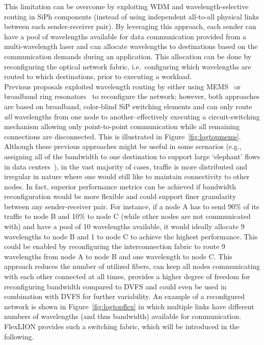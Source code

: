 This limitation can be overcome by exploiting WDM and wavelength-selective routing in SiPh components (instead of using independent all-to-all physical links between each sender-receiver pair). By leveraging this approach, each sender can have a pool of wavelengths available for data communication provided from a multi-wavelength laser and can allocate wavelengths to destinations based on the communication demands during an application. This allocation can be done by reconfiguring the optical network fabric, i.e.\ configuring which wavelengths are routed to which destinations, prior to executing a workload.\\
Previous proposals exploited wavelength routing by either using MEMS~\cite{seok2016highly} or broadband ring resonators~\cite{bergman2014photonic} to reconfigure the network; however, both approaches are based on broadband, color-blind SiP switching elements and can only route \textit{all} wavelengths from one node to another--effectively executing a circuit-switching mechanism allowing only point-to-point communication while all remaining connections are disconnected. This is illustrated in Figure~\ref{fig:logtopmems}. \\
Although these previous approaches might be useful in some scenarios (e.g., assigning all of the bandwidth to one destination to support large `elephant' flows in data centers~\cite{Farrington2010Helios}), in the vast majority of cases, traffic is more distributed and irregular in nature where one would still like to maintain connectivity to other nodes. In fact, superior performance metrics can be achieved if bandwidth reconfiguration would be more flexible and could support finer granularity between any sender-receiver pair. For instance, if a node A has to send 90\% of its traffic to node B and 10\% to node C (while other nodes are not communicated with) and have a pool of 10 wavelengths available, it would ideally allocate 9 wavelengths to node B and 1 to node C to achieve the highest performance. This could be enabled by reconfiguring the interconnection fabric to route 9 wavelengths from node A to node B and one wavelength to node C. This approach reduces the number of utilized fibers, can keep all nodes communicating with each other connected at all times, provides a higher degree of freedom for reconfiguring bandwidth compared to DVFS and could even be used in combination with DVFS for further variability. An example of a reconfigured network is shown in Figure~\ref{fig:logtopflex} in which multiple links have different numbers of wavelengths (and thus bandwidth) available for communication. FlexLION provides such a switching fabric, which will be introduced in the following. 

